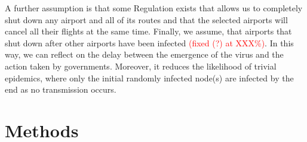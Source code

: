 \documentclass{Template resources/netsci-project}
\begin{document}
A further assumption is that some Regulation exists that allows us to completely shut down any airport and all of its routes and that the selected airports will cancel all their flights at the same time. 
Finally, we assume, that airports that shut down after other airports have been infected \textcolor{red}{(fixed (?) at XXX\%)}. In this way, we can reflect on the delay between the emergence of the virus and the action taken by governments. Moreover, it reduces the likelihood of trivial epidemics, where only the initial randomly infected node(s) are infected by the end as no transmission occurs.





\section{Methods}
\end{document}
